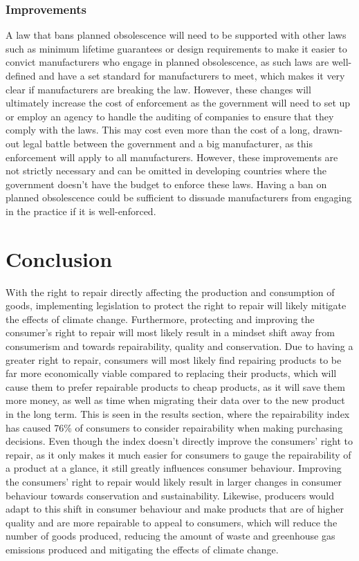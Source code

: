 \documentclass[11pt]{article}
\begin{document}
 \newpage

\subsubsection{Improvements}
\label{sec:org4a396ef}
A law that bans planned obsolescence will need to be supported with other laws such as minimum lifetime guarantees or design requirements to make it easier to convict manufacturers who engage in planned obsolescence, as such laws are well-defined and have a set standard for manufacturers to meet, which makes it very clear if manufacturers are breaking the law. However, these changes will ultimately increase the cost of enforcement as the government will need to set up or employ an agency to handle the auditing of companies to ensure that they comply with the laws. This may cost even more than the cost of a long, drawn-out legal battle between the government and a big manufacturer, as this enforcement will apply to all manufacturers. However, these improvements are not strictly necessary and can be omitted in developing countries where the government doesn't have the budget to enforce these laws. Having a ban on planned obsolescence could be sufficient to dissuade manufacturers from engaging in the practice if it is well-enforced.

 \newpage

\section{Conclusion}
\label{sec:org608e3e5}
With the right to repair directly affecting the production and consumption of goods, implementing legislation to protect the right to repair will likely mitigate the effects of climate change. Furthermore, protecting and improving the consumer's right to repair will most likely result in a mindset shift away from consumerism and towards repairability, quality and conservation. Due to having a greater right to repair, consumers will most likely find repairing products to be far more economically viable compared to replacing their products, which will cause them to prefer repairable products to cheap products, as it will save them more money, as well as time when migrating their data over to the new product in the long term. This is seen in the results section, where the repairability index has caused 76\% of consumers to consider repairability when making purchasing decisions. Even though the index doesn't directly improve the consumers' right to repair, as it only makes it much easier for consumers to gauge the repairability of a product at a glance, it still greatly influences consumer behaviour. Improving the consumers' right to repair would likely result in larger changes in consumer behaviour towards conservation and sustainability. Likewise, producers would adapt to this shift in consumer behaviour and make products that are of higher quality and are more repairable to appeal to consumers, which will reduce the number of goods produced, reducing the amount of waste and greenhouse gas emissions produced and mitigating the effects of climate change.
\end{document}
